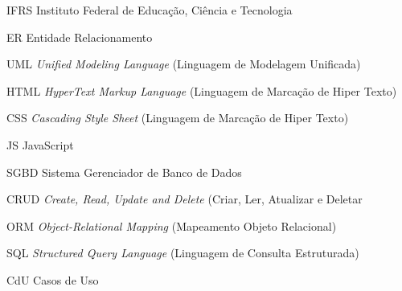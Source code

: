 %
%

\begin{siglas}
	\setlength{\baselineskip}{0.7\baselineskip}

		\item[IFRS] Instituto Federal de Educação, Ciência e Tecnologia
    \item[ER] Entidade Relacionamento
    \item[UML] \textit{Unified Modeling Language} (Linguagem de Modelagem Unificada)
    \item[HTML] \textit{HyperText Markup Language} (Linguagem de Marcação de Hiper Texto)
    \item[CSS] \textit{Cascading Style Sheet} (Linguagem de Marcação de Hiper Texto)
    \item[JS] JavaScript
		\item[SGBD] Sistema Gerenciador de Banco de Dados
		\item[CRUD] \textit{Create, Read, Update and Delete} (Criar, Ler, Atualizar e Deletar
		\item[ORM] \textit{Object-Relational Mapping} (Mapeamento Objeto Relacional)
		\item[SQL] \textit{Structured Query Language} (Linguagem de Consulta Estruturada)
		\item[CdU] Casos de Uso

\end{siglas}
